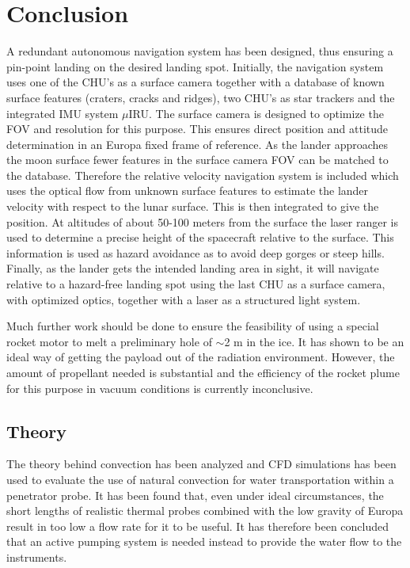 \chapter{Conclusion}


A redundant autonomous navigation system has been designed, thus ensuring a pin-point landing on the desired landing spot. Initially, the navigation system uses one of the CHU's as a surface camera together with a database of known surface features (craters, cracks and ridges), two CHU's as star trackers and the integrated IMU system $\mu$IRU. The surface camera is designed to optimize the FOV and resolution for this purpose. This ensures direct position and attitude determination in an Europa fixed frame of reference.
As the lander approaches the moon surface fewer features in the surface camera FOV
can be matched to the database. Therefore the relative velocity navigation system is included
which uses the optical flow from unknown surface features to estimate
the lander velocity with respect to the lunar surface. This is then integrated to give the
position. At altitudes of about 50-100 meters from the surface the laser ranger is used to determine a precise height of the spacecraft relative to the surface. This information is used as hazard avoidance as to avoid deep gorges or steep hills. Finally, as the lander gets the intended landing area in sight, it will navigate
relative to a hazard-free landing spot using the last CHU as a surface camera, with optimized optics, together with a laser as a structured light system. 

Much further work should be done to ensure the feasibility of using a special rocket motor to melt a preliminary hole of $\sim$2 m in the ice. It has shown to be an ideal way of getting the payload out of the radiation environment. However, the amount of propellant needed is substantial and the efficiency of the rocket plume for this purpose in vacuum conditions is currently inconclusive.

\section{Theory}
The theory behind convection has been analyzed and CFD simulations has been used to evaluate the use of natural convection for water transportation within a penetrator probe. It has been found that, even under ideal circumstances, the short lengths of realistic thermal probes combined with the low gravity of Europa result in too low a flow rate for it to be useful. It has therefore been concluded that an active pumping system is needed instead to provide the water flow to the instruments.

